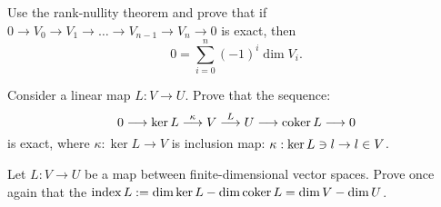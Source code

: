 \begin{prob}
  Use the rank-nullity theorem and prove that if $0\to V_0\to V_1\to\dots\to V_{n-1}\to V_n\to 0$ is exact, then
  $$0=\sum_{i=0}^n (-1)^i \dim V_i.$$
\end{prob}

\begin{prob}
  Consider a linear map $L : V\to U$. Prove that the sequence:
  $$0\longrightarrow \text{ker\,} L\stackrel{\kappa}{\longrightarrow} V\stackrel{L}{\longrightarrow} U\longrightarrow \text{coker\,} L \longrightarrow 0$$
  is exact, where $\kappa : \ker L \to V$ is inclusion map: $\kappa :\text{ker\,} L\ni l\to l\in V$.
\end{prob}

\begin{prob}
  Let $L : V\to U$ be a map between finite-dimensional vector spaces. Prove once again that the $\text{index\,} L:=\dim \text{ker\,} L - \dim \text{coker\,} L =\dim V - \dim U$.
\end{prob}
